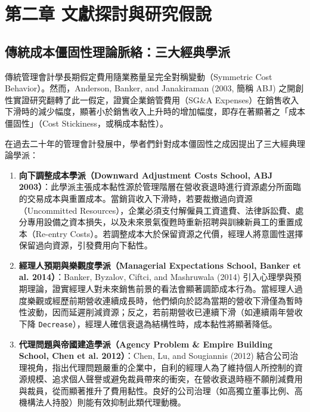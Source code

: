 \documentclass[12pt,a4paper]{article}
\begin{document}
\newpage

\section{第二章 文獻探討與研究假說}

\subsection{傳統成本僵固性理論脈絡：三大經典學派}

傳統管理會計學長期假定費用隨業務量呈完全對稱變動（Symmetric Cost Behavior）。然而，Anderson, Banker, and Janakiraman (2003, 簡稱 ABJ) 之開創性實證研究翻轉了此一假定，證實企業銷管費用（SG\&A Expenses）在銷售收入下滑時的減少幅度，顯著小於銷售收入上升時的增加幅度，即存在著顯著之「成本僵固性」（Cost Stickiness，或稱成本黏性）。

在過去二十年的管理會計發展中，學者們針對成本僵固性之成因提出了三大經典理論學派：

\begin{enumerate}[leftmargin=*]
    \item \textbf{向下調整成本學派（Downward Adjustment Costs School, ABJ 2003）}：此學派主張成本黏性源於管理階層在營收衰退時進行資源處分所面臨的交易成本與重置成本。當銷貨收入下滑時，若要裁撤過向資源（Uncommitted Resources），企業必須支付解僱員工資遣費、法律訴訟費、處分專用設備之資本損失，以及未來景氣復甦時重新招聘與訓練新員工的重置成本（Re-entry Costs）。若調整成本大於保留資源之代價，經理人將意圖性選擇保留過向資源，引發費用向下黏性。
    \item \textbf{經理人預期與樂觀度學派（Managerial Expectations School, Banker et al. 2014）}：Banker, Byzalov, Ciftci, and Mashruwala (2014) 引入心理學與預期理論，證實經理人對未來銷售前景的看法會顯著調節成本行為。當經理人過度樂觀或經歷前期營收連續成長時，他們傾向於認為當期的營收下滑僅為暫時性波動，因而延遲削減資源；反之，若前期營收已連續下滑（如連續兩年營收下降 \texttt{Decrease}），經理人確信衰退為結構性時，成本黏性將顯著降低。
    \item \textbf{代理問題與帝國建造學派（Agency Problem \& Empire Building School, Chen et al. 2012）}：Chen, Lu, and Sougiannis (2012) 結合公司治理視角，指出代理問題嚴重的企業中，自利的經理人為了維持個人所控制的資源規模、追求個人聲譽或避免裁員帶來的衝突，在營收衰退時極不願削減費用與裁員，從而顯著推升了費用黏性。良好的公司治理（如高獨立董事比例、高機構法人持股）則能有效抑制此類代理動機。
\end{enumerate}
\end{document}
